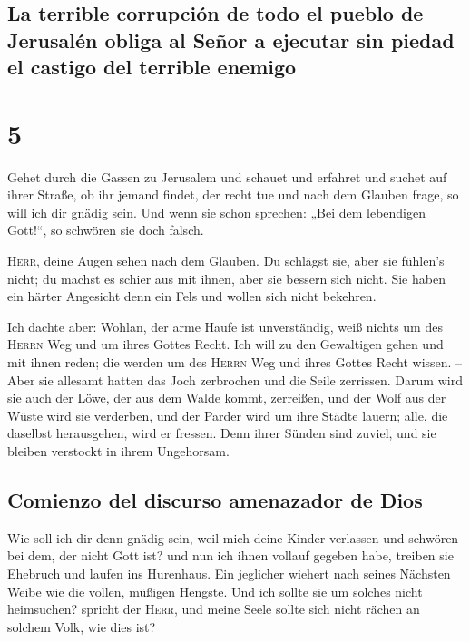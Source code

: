 \hypertarget{la-terrible-corrupciuxf3n-de-todo-el-pueblo-de-jerusaluxe9n-obliga-al-seuxf1or-a-ejecutar-sin-piedad-el-castigo-del-terrible-enemigo}{%
\subsection{La terrible corrupción de todo el pueblo de Jerusalén obliga
al Señor a ejecutar sin piedad el castigo del terrible
enemigo}\label{la-terrible-corrupciuxf3n-de-todo-el-pueblo-de-jerusaluxe9n-obliga-al-seuxf1or-a-ejecutar-sin-piedad-el-castigo-del-terrible-enemigo}}

\hypertarget{section-4}{%
\section{5}\label{section-4}}

 Gehet durch die Gassen zu Jerusalem und schauet und
erfahret und suchet auf ihrer Straße, ob ihr jemand findet, der recht
tue und nach dem Glauben frage, so will ich dir gnädig sein.
 Und wenn sie schon sprechen: „Bei dem lebendigen
Gott!{}``, so schwören sie doch falsch.

 \textsc{Herr}, deine Augen sehen nach dem Glauben. Du
schlägst sie, aber sie fühlen's nicht; du machst es schier aus mit
ihnen, aber sie bessern sich nicht. Sie haben ein härter Angesicht denn
ein Fels und wollen sich nicht bekehren.

 Ich dachte aber: Wohlan, der arme Haufe ist unverständig,
weiß nichts um des \textsc{Herrn} Weg und um ihres Gottes Recht.
 Ich will zu den Gewaltigen gehen und mit ihnen reden; die
werden um des \textsc{Herrn} Weg und ihres Gottes Recht wissen. -- Aber
sie allesamt hatten das Joch zerbrochen und die Seile zerrissen.
 Darum wird sie auch der Löwe, der aus dem Walde kommt,
zerreißen, und der Wolf aus der Wüste wird sie verderben, und der Parder
wird um ihre Städte lauern; alle, die daselbst herausgehen, wird er
fressen. Denn ihrer Sünden sind zuviel, und sie bleiben verstockt in
ihrem Ungehorsam.

\hypertarget{comienzo-del-discurso-amenazador-de-dios}{%
\subsection{Comienzo del discurso amenazador de
Dios}\label{comienzo-del-discurso-amenazador-de-dios}}

 Wie soll ich dir denn gnädig sein, weil mich deine Kinder
verlassen und schwören bei dem, der nicht Gott ist? und nun ich ihnen
vollauf gegeben habe, treiben sie Ehebruch und laufen ins Hurenhaus.
 Ein jeglicher wiehert nach seines Nächsten Weibe wie die
vollen, müßigen Hengste.  Und ich sollte sie um solches
nicht heimsuchen? spricht der \textsc{Herr}, und meine Seele sollte sich
nicht rächen an solchem Volk, wie dies ist?

